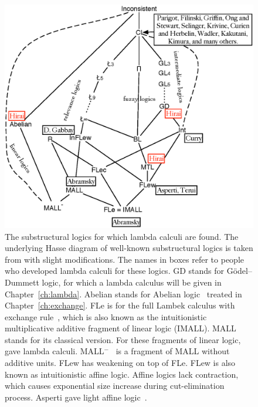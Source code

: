  \begin{figure}
  \centering
  \includegraphics[scale=0.8]{lattice.eps}
  \caption[The lattice of substructural logics, some of which with known lambda calculi.]
  {\small
  The substructural logics for which lambda calculi are found.
  The underlying Hasse diagram of well-known substructural logics is
  taken from
  \cite[p.~120]{residuated} with slight modifications.
  The names in boxes refer to people who developed lambda calculi for
  these logics.{
  \textsf{GD} stands for G\"odel--Dummett logic, for which
  a lambda calculus will be given in
  Chapter~\ref{ch:lambda}.
  \textsf{Abelian} stands for Abelian
  logic~\citep{casari1989,metcalfe2002}
  treated in Chapter~\ref{ch:exchange}.
  \textsf{FLe} is for the full Lambek calculus with exchange
  rule~\citep[p.86]{residuated}, which is also known as the
  intuitionistic
  multiplicative additive fragment of linear logic (\textsf{IMALL}).
  \textsf{MALL} stands for its classical version.  For these fragments of linear
  logic,
  \citet{abramsky1993computational} gave lambda calculi.
  \textsf{MALL}$^-$~\citep{girard1987}
  is a fragment of \textsf{MALL} without additive
  units.
  \textsf{FLew} has weakening on top of \textsf{FLe}.
  \textsf{FLew} is also known as intuitionistic affine logic.
  Affine logics lack contraction, which causes exponential size increase
  during cut-elimination process.
  Asperti gave light affine logic~\citep{asperti2002}.
}}
\end{figure}

